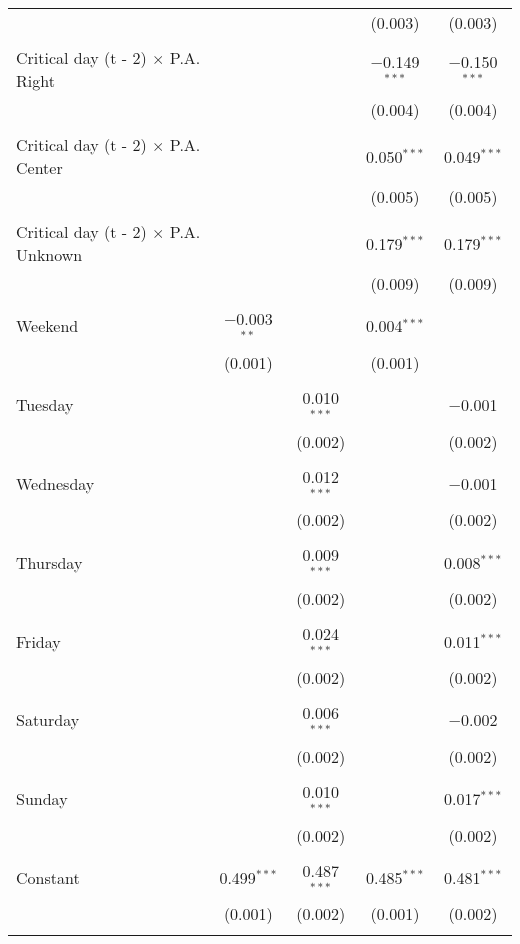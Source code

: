 \documentclass[
]{article}
\begin{document}
\begin{table}[!htbp]
{\begin{tabular}{@{\extracolsep{5pt}}lcccc}
  &  &  & (0.003) & (0.003) \\ 
  & & & & \\ 
 Critical day (t - 2) $\times$ P.A. Right &  &  & $-$0.149$^{***}$ & $-$0.150$^{***}$ \\ 
  &  &  & (0.004) & (0.004) \\ 
  & & & & \\ 
 Critical day (t - 2) $\times$ P.A. Center &  &  & 0.050$^{***}$ & 0.049$^{***}$ \\ 
  &  &  & (0.005) & (0.005) \\ 
  & & & & \\ 
 Critical day (t - 2) $\times$ P.A. Unknown &  &  & 0.179$^{***}$ & 0.179$^{***}$ \\ 
  &  &  & (0.009) & (0.009) \\ 
  & & & & \\ 
 Weekend & $-$0.003$^{**}$ &  & 0.004$^{***}$ &  \\ 
  & (0.001) &  & (0.001) &  \\ 
  & & & & \\ 
 Tuesday &  & 0.010$^{***}$ &  & $-$0.001 \\ 
  &  & (0.002) &  & (0.002) \\ 
  & & & & \\ 
 Wednesday &  & 0.012$^{***}$ &  & $-$0.001 \\ 
  &  & (0.002) &  & (0.002) \\ 
  & & & & \\ 
 Thursday &  & 0.009$^{***}$ &  & 0.008$^{***}$ \\ 
  &  & (0.002) &  & (0.002) \\ 
  & & & & \\ 
 Friday &  & 0.024$^{***}$ &  & 0.011$^{***}$ \\ 
  &  & (0.002) &  & (0.002) \\ 
  & & & & \\ 
 Saturday &  & 0.006$^{***}$ &  & $-$0.002 \\ 
  &  & (0.002) &  & (0.002) \\ 
  & & & & \\ 
 Sunday &  & 0.010$^{***}$ &  & 0.017$^{***}$ \\ 
  &  & (0.002) &  & (0.002) \\ 
  & & & & \\ 
 Constant & 0.499$^{***}$ & 0.487$^{***}$ & 0.485$^{***}$ & 0.481$^{***}$ \\ 
  & (0.001) & (0.002) & (0.001) & (0.002) \\ 
  & & & & \\ 

\end{tabular}}
\end{table}
\end{document}
